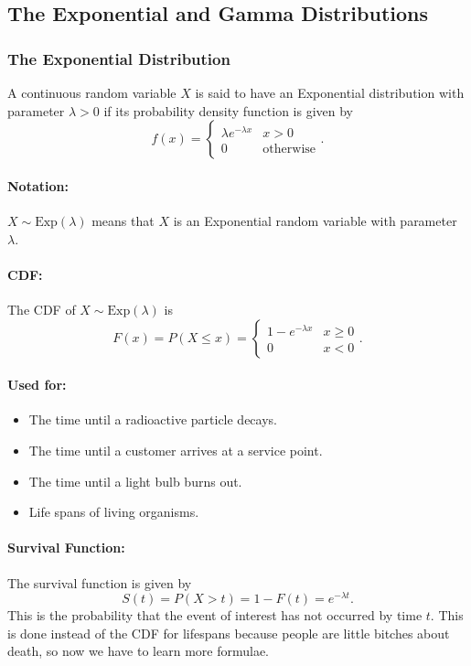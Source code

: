 \subsection{The Exponential and Gamma Distributions}
\hrulefill

\subsubsection*{The Exponential Distribution}
A continuous random variable $X$ is said to have an Exponential distribution with parameter
$\lambda > 0$ if its probability density function is given by
\[f(x) = \begin{cases}
\lambda e^{-\lambda x} & x > 0 \\
0 & \text{otherwise}
\end{cases}.\]

\paragraph*{Notation:} $X \sim \text{Exp}(\lambda)$ means that $X$ is an Exponential random variable with parameter
$\lambda$.

\paragraph*{CDF:} The CDF of $X \sim \text{Exp}(\lambda)$ is
\[F(x) = P(X \leq x) = \begin{cases}
1 - e^{-\lambda x} & x \geq 0 \\
0 & x < 0
\end{cases}.\]

\paragraph*{Used for:}
\begin{itemize}
    \item The time until a radioactive particle decays.
    \item The time until a customer arrives at a service point.
    \item The time until a light bulb burns out.
    \item Life spans of living organisms.
\end{itemize}

\paragraph*{Survival Function:} The survival function is given by
\[S(t) = P(X > t) = 1 - F(t) = e^{-\lambda t}.\]
This is the probability that the event of interest has not occurred by time $t$.
This is done instead of the CDF for lifespans because people are little bitches about death, so now we have to 
learn more formulae.

